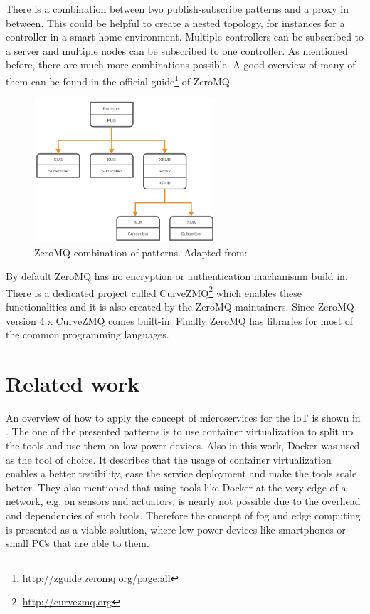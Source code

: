 There is a combination between two publish-subscribe patterns and a proxy in between.
This could be helpful to create a nested topology, for instances for a controller in a smart home environment.
Multiple controllers can be subscribed to a server and multiple nodes can be subscribed to one controller.
As mentioned before, there are much more combinations possible.
A good overview of many of them can be found in the official guide\footnote{\url{http://zguide.zeromq.org/page:all}} of ZeroMQ.

\begin{figure}[H]
    \centering
    \includegraphics[width=0.6\textwidth]{resources/images/zeromq-complex.png}
    \caption[ZeroMQ combination of patterns]{ZeroMQ combination of patterns. Adapted from: \autocite{ZeroMQ:Guide}}
    \label{fig:zeromq_comination}
\end{figure}

By default ZeroMQ has no encryption or authentication machanismn build in.
There is a dedicated project called CurveZMQ\footnote{\url{http://curvezmq.org}} which enables these functionalities and it is also created by the ZeroMQ maintainers.
Since ZeroMQ version 4.x CurveZMQ comes built-in.
Finally ZeroMQ has libraries for most of the common programming languages.

\section{Related work}
\label{section:related_work}
An overview of how to apply the concept of microservices for the \ac{IoT} is shown in \autocite{Butzin:2016}.
The one of the presented patterns is to use container virtualization to split up the tools and use them on low power devices.
Also in this work, Docker was used as the tool of choice.
It describes that the usage of container virtualization enables a better testibility, ease the service deployment and make the tools scale better.\autocite[cf.][p. 5]{Butzin:2016}
They also mentioned that using tools like Docker at the very edge of a network, e.g. on sensors and actuators, is nearly not possible due to the overhead and dependencies of such tools.\autocite[cf.][p. 5]{Butzin:2016}
Therefore the concept of fog and edge computing is presented as a viable solution, where low power devices like smartphones or small \acp{PC} that are able to them.\autocite[cf.][p. 5]{Butzin:2016}

